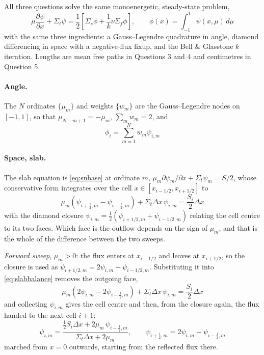 \documentclass[11pt]{article}
\begin{document}
All three questions solve the same monoenergetic, steady-state problem,
\begin{equation}
    \mu \frac{\partial \psi}{\partial x} + \Sigma_t \psi = \frac{1}{2}\left[\Sigma_s \phi + \frac{1}{k}\nu\Sigma_f \phi\right],
    \qquad \phi(x) = \int_{-1}^{1}\psi(x,\mu)\,d\mu
    \label{eq:snbase}
\end{equation}
with the same three ingredients: a Gauss--Legendre quadrature in angle, diamond differencing in space with a negative-flux fixup, and the Bell \& Glasstone $k$ iteration. Lengths are mean free paths in Questions 3 and 4 and centimetres in Question 5.

\paragraph{Angle.} The $N$ ordinates $\{\mu_m\}$ and weights $\{w_m\}$ are the Gauss--Legendre nodes on $[-1,1]$, so that $\mu_{N-m+1}=-\mu_m$, $\sum_m w_m = 2$, and
\begin{equation}
    \phi_i = \sum_{m=1}^{N} w_m \psi_{i,m}
\end{equation}

\paragraph{Space, slab.} The slab equation is \eqref{eq:snbase} at ordinate $m$,
$\mu_m \partial \psi_m/\partial x + \Sigma_t \psi_m = S/2$, whose conservative form
integrates over the cell $x\in[x_{i-1/2},x_{i+1/2}]$ to
\begin{equation}
    \mu_m\left(\psi_{i+\frac12,m} - \psi_{i-\frac12,m}\right)
    + \Sigma_t \Delta x\, \psi_{i,m} = \frac{S_i}{2}\Delta x
    \label{eq:slabbalance}
\end{equation}
with the diamond closure $\psi_{i,m} = \tfrac12\left(\psi_{i+1/2,m}+\psi_{i-1/2,m}\right)$
relating the cell centre to its two faces. Which face is the outflow depends on the sign of
$\mu_m$, and that is the whole of the difference between the two sweeps.

\emph{Forward sweep}, $\mu_m>0$: the flux enters at $x_{i-1/2}$ and leaves at
$x_{i+1/2}$, so the closure is used as $\psi_{i+1/2,m}=2\psi_{i,m}-\psi_{i-1/2,m}$. Substituting
it into \eqref{eq:slabbalance} removes the outgoing face,
\begin{equation}
    \mu_m\left(2\psi_{i,m}-2\psi_{i-\frac12,m}\right) + \Sigma_t \Delta x\,\psi_{i,m}
    = \frac{S_i}{2}\Delta x
\end{equation}
and collecting $\psi_{i,m}$ gives the cell centre and then, from the closure
again, the flux handed to the next cell $i+1$:
\begin{equation}
    \psi_{i,m} = \frac{\tfrac12 S_i \Delta x + 2\mu_m\,\psi_{i-\frac12,m}}
                      {\Sigma_t \Delta x + 2\mu_m},
    \qquad
    \psi_{i+\frac12,m} = 2\psi_{i,m} - \psi_{i-\frac12,m}
    \label{eq:slabsweep}
\end{equation}
marched from $x=0$ outwards, starting from the reflected flux there.
\end{document}
